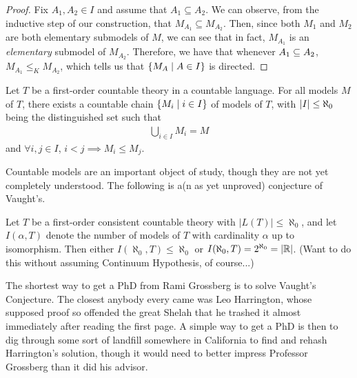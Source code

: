 \begin{proof}
    Fix $A_1, A_2 \in I$ and assume that $A_1 \subseteq A_2$. We can observe, from the inductive step of our construction, that $M_{A_1} \subseteq M_{A_2}$. Then, since both $M_1$ and $M_2$ are both elementary submodels of $M$, we can see that in fact, $M_{A_1}$ is an \textit{elementary} submodel of $M_{A_2}$. Therefore, we have that whenever $A_1 \subseteq A_2$, $M_{A_1} \leq_K M_{A_2}$, which tells us that $\left\{ M_A \; \middle\vert \; A \in I \right\}$ is directed.
\end{proof}

\begin{boxcorollary}
    Let $T$ be a first-order countable theory in a countable language. For all models $M$ of $T$, there exists a countable chain $\left\{ M_i \; \middle\vert \; i \in I \right\}$ of models of $T$, with $\left\lvert I \right\rvert \leq \aleph_0$ being the distinguished set such that
    \begin{align*}
        \bigcup_{i \in I} M_i = M
    \end{align*}
    and $\forall i, j \in I$, $i < j \implies M_i \leq M_j$.
\end{boxcorollary}

Countable models are an important object of study, though they are not yet completely understood. The following is a(n as yet unproved) conjecture of Vaught's.

\begin{boxconjecture}[Vaught 1962]
    Let $T$ be a first-order consistent countable theory with $|L(T)|\leq \aleph_0$, and let $I(\alpha, T)$ denote the number of models of $T$ with cardinality $\alpha$ up to isomorphism. Then either $I(\aleph_0, T)\leq \aleph_0$ or $I(\aleph_0, T)=2^{\aleph_0}=|\mathbb{R}|$. (Want to do this without assuming Continuum Hypothesis, of course...)
\end{boxconjecture}

The shortest way to get a PhD from Rami Grossberg is to solve Vaught's Conjecture. The closest anybody every came was Leo Harrington, whose supposed proof so offended the great Shelah that he trashed it almost immediately after reading the first page. A simple way to get a PhD is then to dig through some sort of landfill somewhere in California to find and rehash Harrington's solution, though it would need to better impress Professor Grossberg than it did his advisor.